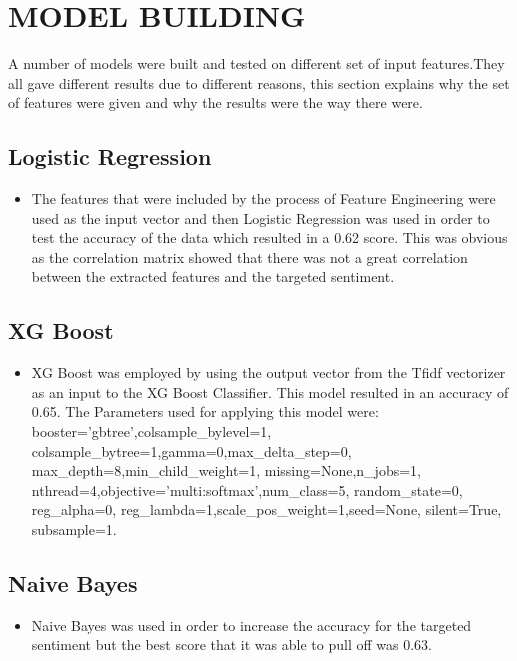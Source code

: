 \documentclass[12pt]{article}
\begin{document}
 \section{MODEL BUILDING}
 A number of models were built and tested on different set of input features.They all gave different results due to different reasons, this section explains why the set of features were given and why the results were the way there were.
 \subsection{Logistic Regression}
 \begin{itemize}
     \item The features that were included by the process of Feature Engineering were used as the input vector and then Logistic Regression was used in order to test the accuracy of the data which resulted in a 0.62 score. This was obvious as the correlation matrix showed that there was not a great correlation between the extracted features and the targeted sentiment.
     
 \end{itemize}
 
 
 
 \subsection{XG Boost}
 \begin{itemize}
     \item XG Boost was employed by using the output vector from the Tfidf vectorizer as an input to the XG Boost Classifier. This model resulted in an accuracy of 0.65. The Parameters used for applying this model were:  booster='gbtree',colsample\_bylevel=1,
       colsample\_bytree=1,gamma=0,max\_delta\_step=0,
       max\_depth=8,min\_child\_weight=1,
       missing=None,n\_jobs=1,
       nthread=4,objective='multi:softmax',num\_class=5,
       random\_state=0,
       reg\_alpha=0,
       reg\_lambda=1,scale\_pos\_weight=1,seed=None,
       silent=True,
       subsample=1.
 \end{itemize}
 
 \subsection{Naive Bayes}
 \begin{itemize}
     \item Naive Bayes was used in order to increase the accuracy for the targeted sentiment but the best score that it was able to pull off was 0.63.
 \end{itemize}
 
\end{document}
